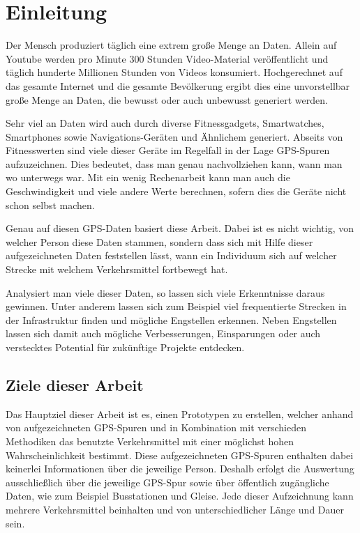 \chapter{Einleitung}
Der Mensch produziert täglich eine extrem große Menge an Daten. Allein auf Youtube werden pro Minute 300 Stunden Video-Material veröffentlicht und täglich hunderte Millionen Stunden von Videos konsumiert.  \cite{youtube_statistics_2015} Hochgerechnet auf das gesamte Internet und die gesamte Bevölkerung ergibt dies eine unvorstellbar große Menge an Daten, die bewusst oder auch unbewusst generiert werden. 

Sehr viel an Daten wird auch durch diverse Fitnessgadgets, Smartwatches, Smartphones sowie Navigations-Geräten und Ähnlichem generiert. Abseits von Fitnesswerten sind viele dieser Geräte im Regelfall in der Lage GPS-Spuren aufzuzeichnen. Dies bedeutet, dass man genau nachvollziehen kann, wann man wo unterwegs war. Mit ein wenig Rechenarbeit kann man auch die Geschwindigkeit und viele andere Werte berechnen, sofern dies die Geräte nicht schon selbst machen. 

Genau auf diesen GPS-Daten basiert diese Arbeit. Dabei ist es nicht wichtig, von welcher Person diese Daten stammen, sondern dass sich mit Hilfe dieser aufgezeichneten Daten feststellen lässt, wann ein Individuum sich auf welcher Strecke mit welchem Verkehrsmittel fortbewegt hat.

Analysiert man viele dieser Daten, so lassen sich viele Erkenntnisse daraus gewinnen. Unter anderem lassen sich zum Beispiel viel frequentierte Strecken in der Infrastruktur finden und mögliche Engstellen erkennen. Neben Engstellen lassen sich damit auch mögliche Verbesserungen, Einsparungen oder auch verstecktes Potential für zukünftige Projekte entdecken.

\section{Ziele dieser Arbeit}
Das Hauptziel dieser Arbeit ist es, einen Prototypen zu erstellen, welcher anhand von aufgezeichneten GPS-Spuren und in Kombination mit verschieden Methodiken das benutzte Verkehrsmittel mit einer möglichst hohen Wahrscheinlichkeit bestimmt. Diese aufgezeichneten GPS-Spuren enthalten dabei keinerlei Informationen über die jeweilige Person. Deshalb erfolgt die Auswertung ausschließlich über die jeweilige GPS-Spur sowie über öffentlich zugängliche Daten, wie zum Beispiel Busstationen und Gleise. Jede dieser Aufzeichnung kann mehrere Verkehrsmittel beinhalten und von unterschiedlicher Länge und Dauer sein.

